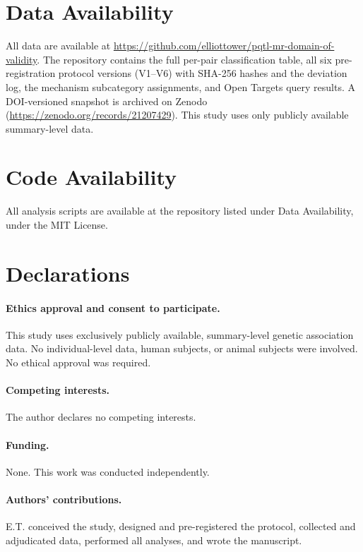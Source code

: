 \documentclass[11pt]{article}
\begin{document}
\section*{Data Availability}

All data are available at \url{https://github.com/elliottower/pqtl-mr-domain-of-validity}. The repository contains the full per-pair classification table, all six pre-registration protocol versions (V1--V6) with SHA-256 hashes and the deviation log, the mechanism subcategory assignments, and Open Targets query results. A DOI-versioned snapshot is archived on Zenodo (\url{https://zenodo.org/records/21207429}). This study uses only publicly available summary-level data.

\section*{Code Availability}

All analysis scripts are available at the repository listed under Data Availability, under the MIT License.

\section*{Declarations}

\paragraph{Ethics approval and consent to participate.}
This study uses exclusively publicly available, summary-level genetic association data. No individual-level data, human subjects, or animal subjects were involved. No ethical approval was required.

\paragraph{Competing interests.}
The author declares no competing interests.

\paragraph{Funding.}
None. This work was conducted independently.

\paragraph{Authors' contributions.}
E.T. conceived the study, designed and pre-registered the protocol, collected and adjudicated data, performed all analyses, and wrote the manuscript.
\end{document}
